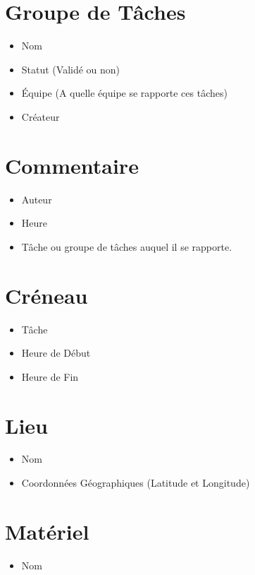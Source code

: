 \section{Groupe de Tâches}
\begin{itemize}
 \item Nom
\item Statut (Validé ou non)
\item Équipe (A quelle équipe se rapporte ces tâches)
\item Créateur

\end{itemize}

\section{Commentaire}
\begin{itemize}
 \item Auteur
\item Heure
\item Tâche ou groupe de tâches auquel il se rapporte.

\end{itemize}


\section{Créneau}
\begin{itemize}
 \item Tâche
\item Heure de Début
\item Heure de Fin

\end{itemize}









\section{Lieu}
\begin{itemize}
\item Nom
\item Coordonnées Géographiques (Latitude et Longitude)

\end{itemize}

\section{Matériel}
\begin{itemize}
\item Nom


\end{itemize}
